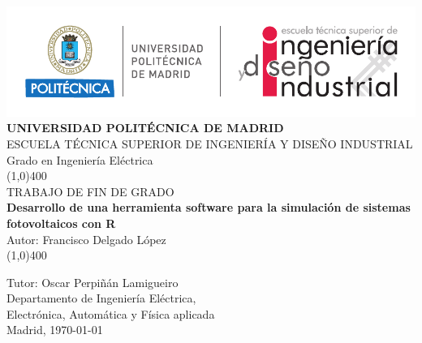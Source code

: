 \begin{center}
\thispagestyle{empty}
\includegraphics[scale=1]{figuras/cabecera.pdf}\\
\vspace*{1cm}
\Large{\textbf{\MakeUppercase{Universidad Politécnica de Madrid}}}\\[3mm]
\Large{{\MakeUppercase{Escuela técnica superior de ingeniería y diseño industrial}}}\\[3mm]
\Large {Grado en Ingeniería Eléctrica}\\
\vfill
\line(1,0){400}\\
\Large{{\MakeUppercase{Trabajo de fin de grado}}}\\
\Huge{\textbf{Desarrollo de una herramienta software para la simulación de sistemas fotovoltaicos con R}}\\[5mm]
\Large{Autor: Francisco Delgado López}\\
\line(1,0){400}\\
\vfill
\end{center}
\begin{flushright}
\Large {Tutor: Oscar Perpiñán Lamigueiro}\\[3mm]
\Large{Departamento de Ingeniería Eléctrica,\\ Electrónica, Automática y Física aplicada}\\[10mm]
Madrid, \today
\end{flushright}
\cleardoublepage 

